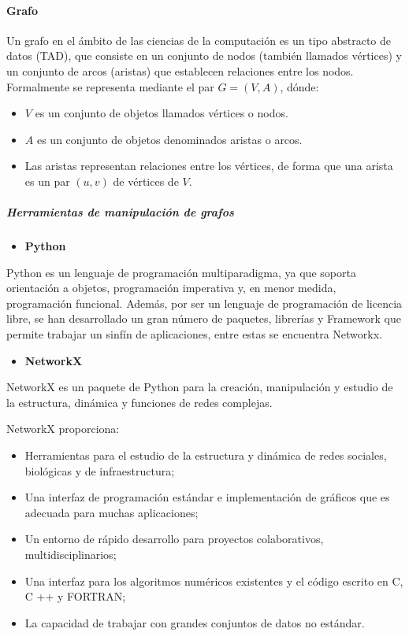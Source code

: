 \documentclass[]{article}
\providecommand{\tightlist}{%
  \setlength{\itemsep}{0pt}\setlength{\parskip}{0pt}}
\let\oldparagraph\paragraph
\renewcommand{\paragraph}[1]{\oldparagraph{#1}\mbox{}}
\let\oldsubparagraph\subparagraph
\renewcommand{\subparagraph}[1]{\oldsubparagraph{#1}\mbox{}}
\begin{document}
\paragraph{Grafo}\label{grafo}

Un grafo en el ámbito de las ciencias de la computación es un tipo
abstracto de datos (TAD), que consiste en un conjunto de nodos (también
llamados vértices) y un conjunto de arcos (aristas) que establecen
relaciones entre los nodos. Formalmente se representa mediante el par
\(G=(V, A)\), dónde:

\begin{itemize}
\item
  \(V\) es un conjunto de objetos llamados vértices o nodos.
\item
  \(A\) es un conjunto de objetos denominados aristas o arcos.
\item
  Las aristas representan relaciones entre los vértices, de forma que
  una arista es un par \((u,v)\) de vértices de \(V\).
\end{itemize}

\subparagraph{Herramientas de manipulación de
grafos}\label{herramientas-de-manipulaciuxf3n-de-grafos}

\begin{itemize}
\tightlist
\item
  \textbf{Python}
\end{itemize}

Python es un lenguaje de programación multiparadigma, ya que soporta
orientación a objetos, programación imperativa y, en menor medida,
programación funcional. Además, por ser un lenguaje de programación de
licencia libre, se han desarrollado un gran número de paquetes,
librerías y Framework que permite trabajar un sinfín de aplicaciones,
entre estas se encuentra Networkx.

\begin{itemize}
\tightlist
\item
  \textbf{NetworkX}
\end{itemize}

NetworkX es un paquete de Python para la creación, manipulación y
estudio de la estructura, dinámica y funciones de redes complejas.

NetworkX proporciona:

\begin{itemize}
\item
  Herramientas para el estudio de la estructura y dinámica de redes
  sociales, biológicas y de infraestructura;
\item
  Una interfaz de programación estándar e implementación de gráficos que
  es adecuada para muchas aplicaciones;
\item
  Un entorno de rápido desarrollo para proyectos colaborativos,
  multidisciplinarios;
\item
  Una interfaz para los algoritmos numéricos existentes y el código
  escrito en C, C ++ y FORTRAN;
\item
  La capacidad de trabajar con grandes conjuntos de datos no estándar.
\end{itemize}
\end{document}
